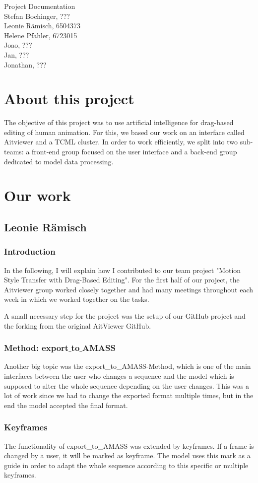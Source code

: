 \documentclass[a4paper]{scrartcl}
\def\header#1#2{
  \begin{center}
    {\Large Project Documentation}\\
    {Stefan Bochinger, ???}\\
    {Leonie Rämisch, 6504373}\\
    {Helene Pfahler, 6723015}\\
    {Joao, ???}\\
    {Jan, ???}\\
    {Jonathan, ???}
  \end{center}
}
\begin{document}
\header{Nr. \NUMBER}{\DEADLINE}

\section*{About this project}
The objective of this project was to use artificial intelligence for drag-based editing of human animation. For this, we based our work on an interface called Aitviewer and a TCML cluster. 
In order to work efficiently, we split into two sub-teams: a front-end group focused on the user interface and a back-end group dedicated to model data processing.  

\section*{Our work}

\subsection*{Leonie Rämisch}
\subsubsection*{Introduction}
In the following, I will explain how I contributed to our team project "Motion Style Transfer with Drag-Based Editing". For the first half of our project, the Aitviewer group worked closely together and had many meetings throughout each week in which we worked together on the tasks. 

A small necessary step for the project was the setup of our GitHub project and the forking from the original AitViewer GitHub.

\subsubsection*{Method: export$\_$to$\_$AMASS}
Another big topic was the export\_to\_AMASS-Method, which is one of the main interfaces between the user who changes a sequence and the model which is supposed to alter the whole sequence depending on the user changes. This was a lot of work since we had to change the exported format multiple times, but in the end the model accepted the final format.

\subsubsection*{Keyframes}
The functionality of export\_to\_AMASS was extended by keyframes. If a frame is changed by a user, it will be marked as keyframe. The model uses this mark as a guide in order to adapt the whole sequence according to this specific or multiple keyframes.
\end{document}
